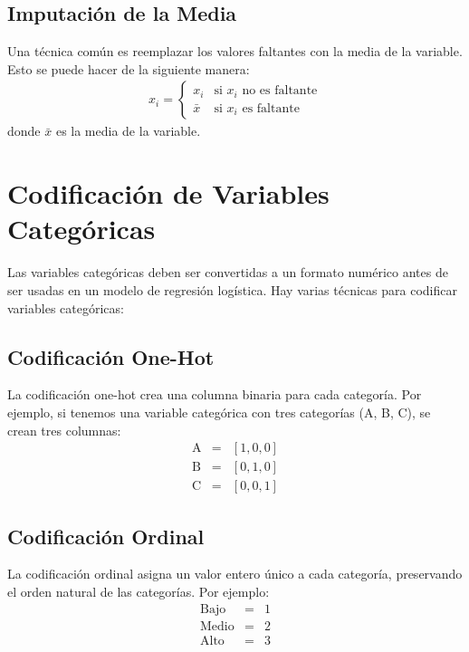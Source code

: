 \documentclass[a4paper]{report} %
\begin{document}
\subsection{Imputaci\'on de la Media}

Una t\'ecnica com\'un es reemplazar los valores faltantes con la media de la variable. Esto se puede hacer de la siguiente manera:
\begin{eqnarray*}
x_i = \begin{cases} 
      x_i & \text{si } x_i \text{ no es faltante} \\
      \bar{x} & \text{si } x_i \text{ es faltante}
   \end{cases}
\end{eqnarray*}
donde $\bar{x}$ es la media de la variable.

\section{Codificaci\'on de Variables Categ\'oricas}

Las variables categ\'oricas deben ser convertidas a un formato num\'erico antes de ser usadas en un modelo de regresi\'on log\'istica. Hay varias t\'ecnicas para codificar variables categ\'oricas:

\subsection{Codificaci\'on One-Hot}

La codificaci\'on one-hot crea una columna binaria para cada categor\'ia. Por ejemplo, si tenemos una variable categ\'orica con tres categor\'ias (A, B, C), se crean tres columnas:
\begin{eqnarray*}
\text{A} &=& [1, 0, 0] \\
\text{B} &=& [0, 1, 0] \\
\text{C} &=& [0, 0, 1]
\end{eqnarray*}

\subsection{Codificaci\'on Ordinal}

La codificaci\'on ordinal asigna un valor entero \'unico a cada categor\'ia, preservando el orden natural de las categor\'ias. Por ejemplo:
\begin{eqnarray*}
\text{Bajo} &=& 1 \\
\text{Medio} &=& 2 \\
\text{Alto} &=& 3
\end{eqnarray*}
\end{document}
